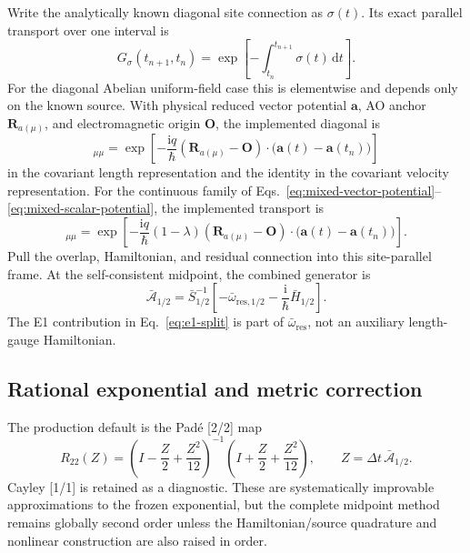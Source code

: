 \documentclass[11pt]{article}
\newcommand{\ii}{\mathrm{i}}
\newcommand{\dd}{\mathrm{d}}
\newcommand{\vect}[1]{\bm{#1}}
\begin{document}
Write the analytically known diagonal site connection as \(\sigma(t)\).
Its exact parallel transport over one interval is
\begin{equation}
 G_\sigma(t_{n+1},t_n)
 =\exp\!\left[-\int_{t_n}^{t_{n+1}}\sigma(t)\,\dd t\right].
 \label{eq:site-transport}
\end{equation}
For the diagonal Abelian uniform-field case this is elementwise and depends
only on the known source. With physical reduced vector potential \(\vect a\),
AO anchor \(\vect R_{a(\mu)}\), and electromagnetic origin \(\vect O\), the
implemented diagonal is
\begin{equation}
 [G_\sigma(t,t_n)]_{\mu\mu}
 =\exp\!\left[-\frac{\ii q}{\hbar}
 (\vect R_{a(\mu)}-\vect O)\cdot
 \bigl(\vect a(t)-\vect a(t_n)\bigr)\right]
 \label{eq:uniform-site-transport}
\end{equation}
in the covariant length representation and the identity in the covariant
velocity representation. For the continuous family of
Eqs.~\eqref{eq:mixed-vector-potential}--\eqref{eq:mixed-scalar-potential}, the
implemented transport is
\begin{equation}
 [G_{\sigma,\lambda}(t,t_n)]_{\mu\mu}
 =\exp\!\left[-\frac{\ii q}{\hbar}(1-\lambda)
 (\vect R_{a(\mu)}-\vect O)\cdot
 \bigl(\vect a(t)-\vect a(t_n)\bigr)\right].
 \label{eq:mixed-site-transport}
\end{equation}
Pull the overlap, Hamiltonian, and residual
connection into this site-parallel frame. At the self-consistent midpoint,
the combined generator is
\begin{equation}
 \bar{\mathcal A}_{1/2}
 =\bar S_{1/2}^{-1}
 \left[-\bar\omega_{\mathrm{res},1/2}
       -\frac{\ii}{\hbar}\bar H_{1/2}\right].
 \label{eq:pulled-generator}
\end{equation}
The E1 contribution in Eq.~\eqref{eq:e1-split} is part of
\(\bar\omega_{\mathrm{res}}\), not an auxiliary length-gauge Hamiltonian.

\subsection{Rational exponential and metric correction}

The production default is the Pad\'e [2/2] map
\begin{equation}
 R_{22}(Z)=
 \left(I-\frac Z2+\frac{Z^2}{12}\right)^{-1}
 \left(I+\frac Z2+\frac{Z^2}{12}\right),
 \qquad Z=\Delta t\,\bar{\mathcal A}_{1/2}.
 \label{eq:pade22}
\end{equation}
Cayley [1/1] is retained as a diagnostic. These are systematically
improvable approximations to the frozen exponential\cite{Higham2008}, but the
complete midpoint method remains globally second order unless the
Hamiltonian/source quadrature and nonlinear construction are also raised in
order.
\end{document}
